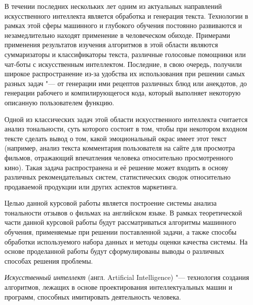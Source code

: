 \documentclass[bachelor, och, coursework]{SCWorks}
\begin{document}


\tableofcontents

\intro

    В течении последних нескольких лет одним из актуальных направлений
    искусственного интеллекта является обработка и генерация текста. Технологии
    в рамках этой сферы машинного и глубокого обучения постоянно развиваются и
    незамедлительно находят применение в человеческом обиходе. Примерами
    применения результатов изучения алгоритмов в этой области являются
    суммаризаторы и классификаторы текста, различные голосовые помощники или
    чат-боты с искусственным интеллектом. Последние, в свою очередь, получили
    широкое распространение из-за удобства их использования при решении самых
    разных задач "--- от генерации ими рецептов различных блюд или анекдотов, до
    генерации рабочего и компилирующегося кода, который выполняет некоторую
    описанную пользователем функцию.

    Одной из классических задач этой области искусственного интеллекта считается
    анализ тональности, суть которого состоит в том, чтобы при некотором входном
    тексте сделать вывод о том, какой эмоциональный окрас имеет этот текст
    (например, анализ текста комментария пользователя на сайте для просмотра
    фильмов, отражающий впечатления человека относительно просмотренного кино).
    Такая задача распространена и её решение может входить в основу различных
    рекомендательных систем, статистических сводок относительно продаваемой
    продукции или других аспектов маркетинга.

    Целью данной курсовой работы является построение системы анализа тональности
    отзывов о фильмах на английском языке. В рамках теоретической части данной
    курсовой работы будут рассматриваться алгоритмы машинного обучения,
    применяемые при решении поставленной задачи, а также способы обработки
    используемого набора данных и методы оценки качества системы. На основе
    проделанной работы будут сформулированы выводы о различных способах решения
    проблемы.


    \textit{Искусственный интеллект} (англ. Artificial Intelligence) "---
    технология создания алгоритмов, лежащих в основе проектирования
    интеллектуальных машин и программ, способных имитировать деятельность
    человека.
\end{document}
